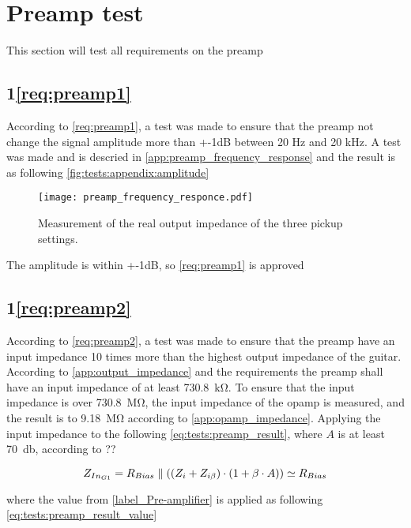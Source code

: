 \section{Preamp test}
This section will test all requirements on the \gls{preamp} 


\subsection{1\autoref{req:preamp1}}
According to \autoref{req:preamp1}, a test was made to ensure that the \gls{preamp} not change the signal amplitude more than +-1dB between 20 Hz and 20 kHz. A test was made and is descried in \autoref{app:preamp_frequency_response} and the result is as following \autoref{fig:tests:appendix:amplitude}

\begin{figure}[htbp!]
	\centering
		\texttt{[image: preamp\_frequency\_responce.pdf]}
		\caption{Measurement of the real output impedance of the three pickup settings.}
		\label{fig:tests:appendix:amplitude}
\end{figure}

The amplitude is within +-1dB, so \autoref{req:preamp1} is approved


\subsection{1\autoref{req:preamp2}}
According to \autoref{req:preamp2}, a test was made to ensure that the \gls{preamp} have an input impedance 10 times more than the highest output impedance of the guitar. According to \autoref{app:output_impedance} and the requirements the \gls{preamp} shall have an input impedance of at least \SI{730.8}{\kilo\ohm}. To ensure that the input impedance is over \SI{730.8}{\mega\ohm}, the input impedance of the \gls{opamp} is measured, and the result is to \SI{9.18}{\mega\ohm} according to \autoref{app:opamp_impedance}. Applying the input impedance to the following \autoref{eq:tests:preamp_result}, where $A$ is at least \SI{70}{\decibel}, according to ??  

\begin{equation}\label{eq:tests:preamp_result}
        Z_{In_{G1}} = R_{Bias} \parallel ((Z_i + Z_{i \beta}) \cdot (1+\beta \cdot A)) \simeq R_{Bias}
        \addunit{\si{\ohm}}
    \end{equation}

where the value from \autoref{label_Pre-amplifier} is applied as following \autoref{eq:tests:preamp_result_value}




